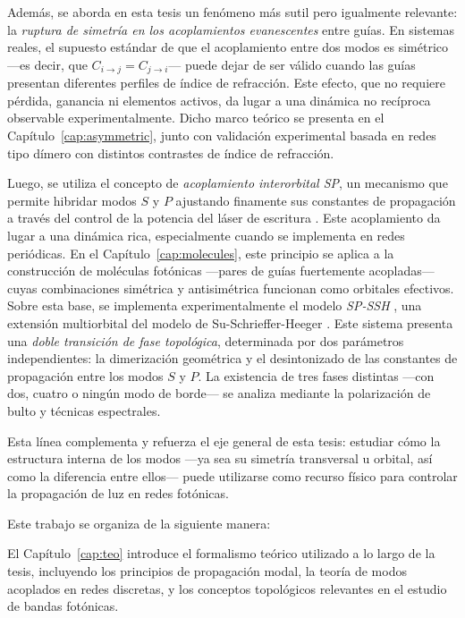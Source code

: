 Además, se aborda en esta tesis un fenómeno más sutil pero igualmente relevante: la \textit{ruptura de simetría en los acoplamientos evanescentes} entre guías. En sistemas reales, el supuesto estándar de que el acoplamiento entre dos modos es simétrico —es decir, que \( C_{i \to j} = C_{j \to i} \)— puede dejar de ser válido cuando las guías presentan diferentes perfiles de índice de refracción. Este efecto, que no requiere pérdida, ganancia ni elementos activos, da lugar a una dinámica no recíproca observable experimentalmente. Dicho marco teórico se presenta en el Capítulo~\ref{cap:asymmetric}, junto con validación experimental basada en redes tipo dímero con distintos contrastes de índice de refracción.

Luego, se utiliza el concepto de \textit{acoplamiento interorbital SP}, un mecanismo que permite hibridar modos \( S \) y \( P \) ajustando finamente sus constantes de propagación a través del control de la potencia del láser de escritura \cite{interorbital}. Este acoplamiento da lugar a una dinámica rica, especialmente cuando se implementa en redes periódicas. En el Capítulo~\ref{cap:molecules}, este principio se aplica a la construcción de moléculas fotónicas —pares de guías fuertemente acopladas— cuyas combinaciones simétrica y antisimétrica funcionan como orbitales efectivos. Sobre esta base, se implementa experimentalmente el modelo \textit{SP-SSH} \cite{SPSSH}, una extensión multiorbital del modelo de Su-Schrieffer-Heeger \citep{ssh}. Este sistema presenta una \textit{doble transición de fase topológica}, determinada por dos parámetros independientes: la dimerización geométrica y el desintonizado de las constantes de propagación entre los modos $S$ y $P$. La existencia de tres fases distintas —con dos, cuatro o ningún modo de borde— se analiza mediante la polarización de bulto y técnicas espectrales.

 

Esta línea complementa y refuerza el eje general de esta tesis: estudiar cómo la estructura interna de los modos —ya sea su simetría transversal u orbital, así como la diferencia entre ellos— puede utilizarse como recurso físico para controlar la propagación de luz en redes fotónicas.


\vspace{1em}

Este trabajo se organiza de la siguiente manera:

El Capítulo~\ref{cap:teo} introduce el formalismo teórico utilizado a lo largo de la tesis, incluyendo los principios de propagación modal, la teoría de modos acoplados en redes discretas, y los conceptos topológicos relevantes en el estudio de bandas fotónicas.

